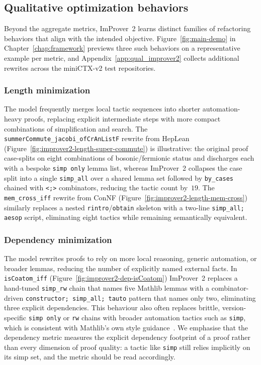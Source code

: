 \subsection{Qualitative optimization behaviors}
\label{sec:qual_behaviors}

Beyond the aggregate metrics, ImProver~2 learns distinct families of refactoring behaviors that align with the intended objective. Figure~\ref{fig:main-demo} in Chapter~\ref{chap:framework} previews three such behaviors on a representative example per metric, and Appendix~\ref{app:qual_improver2} collects additional rewrites across the miniCTX-v2 test repositories.

\subsubsection{Length minimization}

The model frequently merges local tactic sequences into shorter automation-heavy proofs, replacing explicit intermediate steps with more compact combinations of simplification and search. The \texttt{summerCommute\_jacobi\_ofCrAnListF} rewrite from HepLean (Figure~\ref{fig:improver2-length-super-commute}) is illustrative: the original proof case-splits on eight combinations of bosonic/fermionic status and discharges each with a bespoke \texttt{simp only} lemma list, whereas ImProver~2 collapses the case split into a single \texttt{simp\_all} over a shared lemma set followed by \texttt{by\_cases} chained with \texttt{<;>} combinators, reducing the tactic count by~$19$. The \texttt{mem\_cross\_iff} rewrite from ConNF (Figure~\ref{fig:improver2-length-mem-cross}) similarly replaces a nested \texttt{rintro}/\texttt{obtain} skeleton with a two-line \texttt{simp\_all; aesop} script, eliminating eight tactics while remaining semantically equivalent.

\subsubsection{Dependency minimization}

The model rewrites proofs to rely on more local reasoning, generic automation, or broader lemmas, reducing the number of explicitly named external facts. In \texttt{isCoatom\_iff} (Figure~\ref{fig:improver2-dep-isCoatom}) ImProver~2 replaces a hand-tuned \texttt{simp\_rw} chain that names five Mathlib lemmas with a combinator-driven \texttt{constructor; simp\_all; tauto} pattern that names only two, eliminating three explicit dependencies. This behaviour also often replaces brittle, version-specific \texttt{simp only} or \texttt{rw} chains with broader automation tactics such as \texttt{simp}, which is consistent with Mathlib's own style guidance~\cite{lean_style_guide}. We emphasise that the dependency metric measures the explicit dependency footprint of a proof rather than every dimension of proof quality: a tactic like \texttt{simp} still relies implicitly on its simp set, and the metric should be read accordingly.

